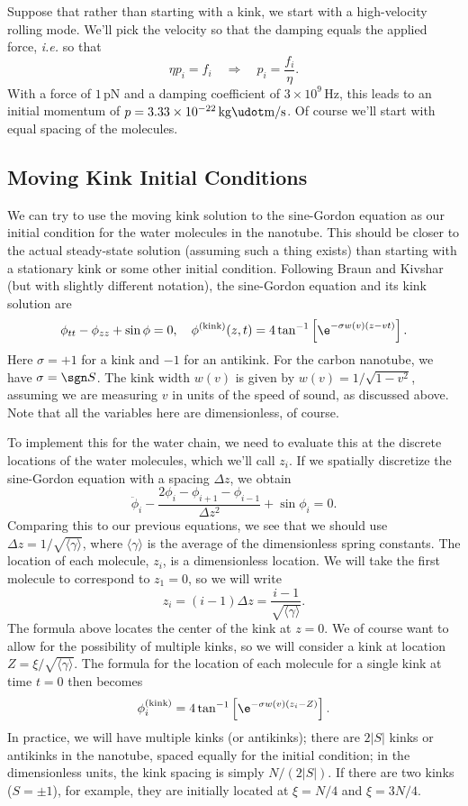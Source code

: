 \documentclass[11pt]{article}
\begin{document}
Suppose that rather than starting with a kink, we start with a high-velocity rolling mode. We'll pick the velocity so that the damping equals the applied force, \textit{i.e.} so that
\[
\eta p_i=f_i\quad\Rightarrow\quad
p_i=\frac{f_i}{\eta}.
\]
With a force of $1\,\text{pN}$ and a damping coefficient of $3\times10^9\,\text{Hz}$, this leads to an initial momentum of $p=3.33\times10^{-22}\,\text{kg}\udot\text{m}/\text{s}$. Of course we'll start with equal spacing of the molecules.

\subsection{Moving Kink Initial Conditions}

We can try to use the moving kink solution to the sine-Gordon equation as our initial condition for the water molecules in the nanotube. This should be closer to the actual steady-state solution (assuming such a thing exists) than starting with a stationary kink or some other initial condition. Following Braun and Kivshar (but with slightly different notation), the sine-Gordon equation and its kink solution are
\[
\phi_{tt}-\phi_{zz}+\sin\phi=0,\quad
\phi^{(\text{kink})}(z,t)=4\tan^{-1}\left[\e^{-\sigma w(v)(z-vt)}\right].
\]
Here $\sigma=+1$ for a kink and $-1$ for an antikink. For the carbon nanotube, we have $\sigma=\sgn S$. The kink width $w(v)$ is given by $w(v)=1/\sqrt{1-v^2}$, assuming we are measuring $v$ in units of the speed of sound, as discussed above. Note that all the variables here are dimensionless, of course.

To implement this for the water chain, we need to evaluate this at the discrete locations of the water molecules, which we'll call $z_i$. If we spatially discretize the sine-Gordon equation with a spacing $\Delta z$, we obtain
\[
\ddot{\phi}_i-\frac{2\phi_i-\phi_{i+1}-\phi_{i-1}}{\Delta z^2}+\sin\phi_i=0.
\]
Comparing this to our previous equations, we see that we should use $\Delta z=1/\sqrt{\langle\gamma\rangle}$, where $\langle\gamma\rangle$ is the average of the dimensionless spring constants. The location of each molecule, $z_i$, is a dimensionless location. We will take the first molecule to correspond to $z_1=0$, so we will write 
\[
z_i=(i-1)\Delta z=\frac{i-1}{\sqrt{\langle\gamma\rangle}}.
\]
The formula above locates the center of the kink at $z=0$. We of course want to allow for the possibility of multiple kinks, so we will consider a kink at location $Z=\xi/\sqrt{\langle\gamma\rangle}$. The formula for the location of each molecule for a single kink at time $t=0$ then becomes
\[
\phi_i^{(\text{kink})}=4\tan^{-1}\left[\e^{-\sigma w(v)(z_i-Z)}\right].
\]
In practice, we will have multiple kinks (or antikinks); there are $2|S|$ kinks or antikinks in the nanotube, spaced equally for the initial condition; in the dimensionless units, the kink spacing is simply $N/(2|S|)$. If there are two kinks ($S=\pm1$), for example, they are initially located at $\xi=N/4$ and $\xi=3N/4$.
\end{document}
